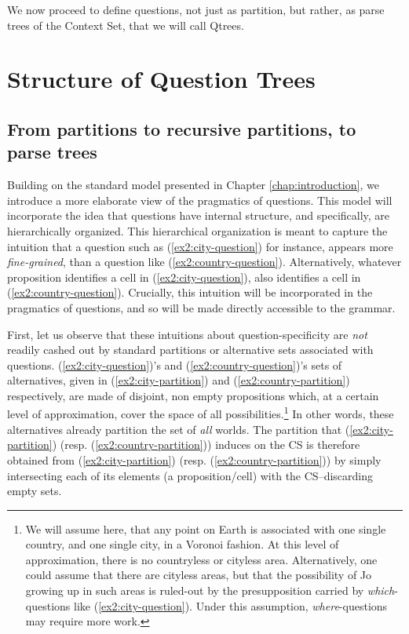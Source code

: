 We now proceed to define questions, not just as partition, but rather, as parse trees of the Context Set, that we will call Qtrees.

\section{Structure of Question Trees}

\subsection{From partitions to recursive partitions, to parse trees}\label{sec:nested-partition}
Building on the standard model presented in Chapter \ref{chap:introduction}, we introduce a more elaborate view of the pragmatics of questions. This model will incorporate the idea that questions have internal structure, and specifically, are hierarchically organized. This hierarchical organization is meant to capture the intuition that a question such as (\ref{ex2:city-question}) for instance, appears more \textit{fine-grained}, than a question like (\ref{ex2:country-question}). Alternatively, whatever proposition identifies a cell in (\ref{ex2:city-question}), also identifies a cell in (\ref{ex2:country-question}). Crucially, this intuition will be incorporated in the pragmatics of questions, and so will be made directly accessible to the grammar.

\begin{exe}
	\ex 
	\begin{xlist}
		\label{ex2:city-question}
		\label{ex2:country-question}
	\end{xlist}
\end{exe}

First, let us observe that these intuitions about question-specificity are \textit{not} readily cashed out by standard partitions or alternative sets associated with questions. (\ref{ex2:city-question})'s and (\ref{ex2:country-question})'s sets of alternatives, given in (\ref{ex2:city-partition}) and (\ref{ex2:country-partition}) respectively, are made of disjoint, non empty propositions which, at a certain level of approximation, cover the space of all possibilities.\footnote{We will assume here, that any point on Earth is associated with one single country, and one single city, in a Voronoi fashion. At this level of approximation, there is no countryless or cityless area. Alternatively, one could assume that there are cityless areas, but that the possibility of Jo growing up in such areas is ruled-out by the presupposition carried by \textit{which}-questions like (\ref{ex2:city-question}). Under this assumption, \textit{where}-questions may require more work.} In other words, these alternatives already partition the set of \textit{all} worlds. The partition that (\ref{ex2:city-partition}) (resp. (\ref{ex2:country-partition})) induces on the CS is therefore obtained from (\ref{ex2:city-partition}) (resp. (\ref{ex2:country-partition})) by simply intersecting each of its elements (a proposition/cell) with the CS--discarding empty sets.

